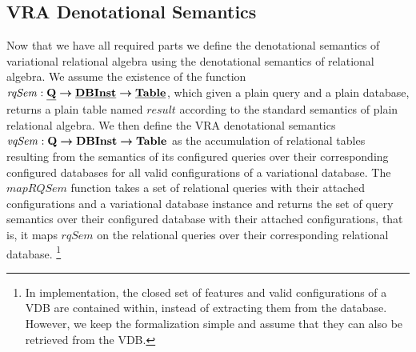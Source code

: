 \subsection{VRA Denotational Semantics }
\label{sec:vradensem}


Now that we have all required parts we define the denotational semantics of 
variational relational algebra using the denotational semantics of relational 
algebra. 
We assume the existence of the function
$\mathit{rqSem} : \pQSet \totype \pInstSet \totype \pTabSet$, which given a plain query and
a plain database, returns a plain table named $\mathit{result}$
according to the standard semantics of plain relational algebra.
%
We then define the VRA denotational semantics 
$\mathit{vqSem} : \qSet \totype \vdbInstSet \totype \tabletype$ as the 
accumulation of relational tables resulting from the semantics of its
configured queries over their corresponding configured databases for all 
valid configurations of a variational database. 
%
The $\mathit{mapRQSem}$ function takes a set of relational queries with their attached
configurations and a variational database instance and returns the set of query 
semantics over their configured database
with their attached configurations, that is, it maps $\mathit{rqSem}$ on the 
relational queries over their corresponding relational database.%
\footnote{In implementation, the closed set of features and valid configurations
of a VDB are contained within, instead of extracting them from the database. However,
we keep the formalization simple and assume that they can also be retrieved from
the VDB.}





